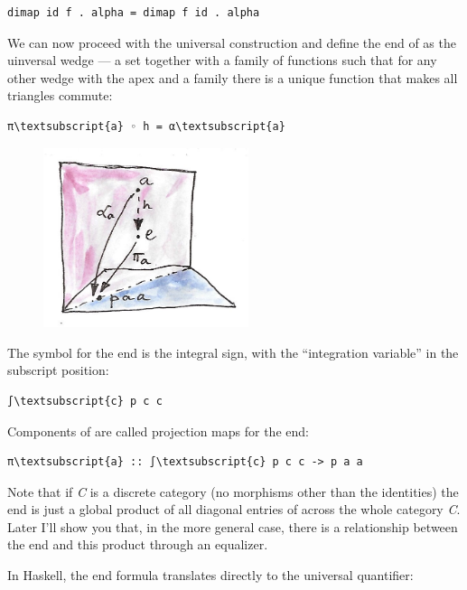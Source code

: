 \begin{verbatim}
dimap id f . alpha = dimap f id . alpha
\end{verbatim}
We can now proceed with the universal construction and define the end of
 as the uinversal wedge --- a set  together with a
family of functions  such that for any other wedge with the
apex  and a family  there is a unique function
 that makes all triangles commute:

\begin{Verbatim}[commandchars=\\\{\}]
π\textsubscript{a} ◦ h = α\textsubscript{a}
\end{Verbatim}

\begin{figure}[H]
\centering
\includegraphics[width=60mm]{images/end-21.jpg}
\end{figure}

\noindent
The symbol for the end is the integral sign, with the ``integration
variable'' in the subscript position:

\begin{Verbatim}[commandchars=\\\{\}]
∫\textsubscript{c} p c c
\end{Verbatim}
Components of  are called projection maps for the end:

\begin{Verbatim}[commandchars=\\\{\}]
π\textsubscript{a} :: ∫\textsubscript{c} p c c -> p a a
\end{Verbatim}
Note that if \emph{C} is a discrete category (no morphisms other than
the identities) the end is just a global product of all diagonal entries
of  across the whole category \emph{C}. Later I'll show you
that, in the more general case, there is a relationship between the end
and this product through an equalizer.

In Haskell, the end formula translates directly to the universal
quantifier:

